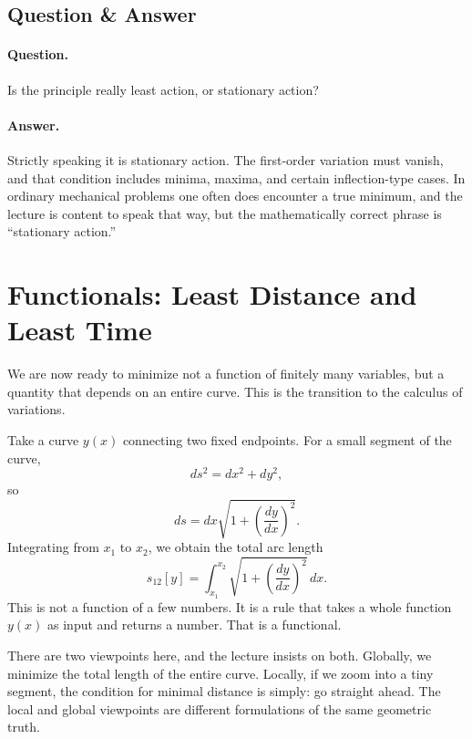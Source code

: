 \subsection{Question \& Answer}

\paragraph{Question.} Is the principle really least action, or stationary action?

\paragraph{Answer.} Strictly speaking it is stationary action. The first-order variation must vanish, and that condition includes minima, maxima, and certain inflection-type cases. In ordinary mechanical problems one often does encounter a true minimum, and the lecture is content to speak that way, but the mathematically correct phrase is ``stationary action.''

\section{Functionals: Least Distance and Least Time}

We are now ready to minimize not a function of finitely many variables, but a quantity that depends on an entire curve. This is the transition to the calculus of variations.

Take a curve \(y(x)\) connecting two fixed endpoints. For a small segment of the curve,
\begin{equation}
ds^2 = dx^2+dy^2,
\end{equation}
so
\begin{equation}
ds=dx\sqrt{1+\left(\frac{dy}{dx}\right)^2}.
\end{equation}
Integrating from \(x_1\) to \(x_2\), we obtain the total arc length
\begin{equation}
s_{12}[y]
=
\int_{x_1}^{x_2}
\sqrt{1+\left(\frac{dy}{dx}\right)^2}\,dx.
\end{equation}
This is not a function of a few numbers. It is a rule that takes a whole function \(y(x)\) as input and returns a number. That is a functional.

There are two viewpoints here, and the lecture insists on both. Globally, we minimize the total length of the entire curve. Locally, if we zoom into a tiny segment, the condition for minimal distance is simply: go straight ahead. The local and global viewpoints are different formulations of the same geometric truth.

